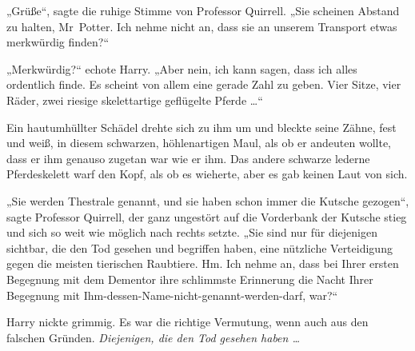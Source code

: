 „Grüße“, sagte die ruhige Stimme von Professor Quirrell.
„Sie scheinen Abstand zu halten, Mr~Potter. Ich nehme nicht an, dass sie an unserem Transport etwas merkwürdig finden?“

„Merkwürdig?“ echote Harry.
„Aber nein, ich kann sagen, dass ich alles ordentlich finde. Es scheint von allem eine gerade Zahl zu geben. Vier Sitze, vier Räder, zwei riesige skelettartige geflügelte Pferde …“

Ein hautumhüllter Schädel drehte sich zu ihm um und bleckte seine Zähne, fest und weiß, in diesem schwarzen, höhlenartigen Maul, als ob er andeuten wollte, dass er ihm genauso zugetan war wie er ihm. Das andere schwarze lederne Pferdeskelett warf den Kopf, als ob es wieherte, aber es gab keinen Laut von sich.

„Sie werden Thestrale genannt, und sie haben schon immer die Kutsche gezogen“, sagte Professor Quirrell, der ganz ungestört auf die Vorderbank der Kutsche stieg und sich so weit wie möglich nach rechts setzte.
„Sie sind nur für diejenigen sichtbar, die den Tod gesehen und begriffen haben, eine nützliche Verteidigung gegen die meisten tierischen Raubtiere. Hm. Ich nehme an, dass bei Ihrer ersten Begegnung mit dem Dementor ihre schlimmste Erinnerung die Nacht Ihrer Begegnung mit Ihm-dessen-Name-nicht-genannt-werden-darf, war?“

Harry nickte grimmig. Es war die richtige Vermutung, wenn auch aus den falschen Gründen. \emph{Diejenigen, die den Tod gesehen haben …}

